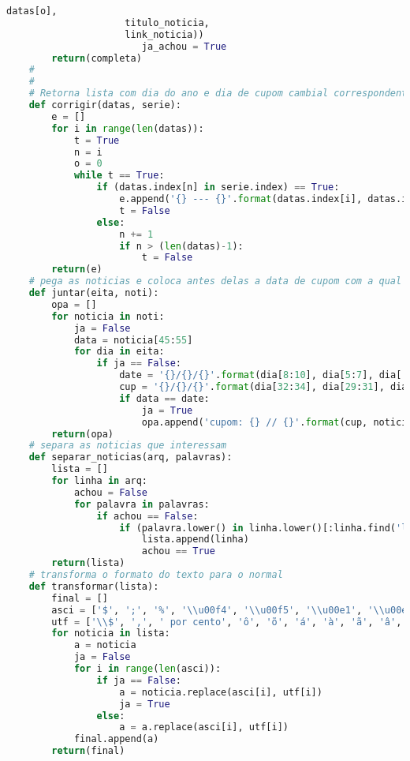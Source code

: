 \begin{lstlisting}[language=Python]
                     datas[o],
                     titulo_noticia,
                     link_noticia))
                        ja_achou = True
        return(completa)
    #
    #
    # Retorna lista com dia do ano e dia de cupom cambial correspondente
    def corrigir(datas, serie):
        e = []
        for i in range(len(datas)):
            t = True
            n = i
            o = 0
            while t == True:
                if (datas.index[n] in serie.index) == True:
                    e.append('{} --- {}'.format(datas.index[i], datas.index[n]))
                    t = False
                else:
                    n += 1
                    if n > (len(datas)-1):
                        t = False
        return(e)
    # pega as noticias e coloca antes delas a data de cupom com a qual ela é relacionada
    def juntar(eita, noti):
        opa = []
        for noticia in noti:
            ja = False
            data = noticia[45:55]
            for dia in eita:
                if ja == False:
                    date = '{}/{}/{}'.format(dia[8:10], dia[5:7], dia[:4])
                    cup = '{}/{}/{}'.format(dia[32:34], dia[29:31], dia[24:28])
                    if data == date:
                        ja = True
                        opa.append('cupom: {} // {}'.format(cup, noticia))
        return(opa)
    # separa as noticias que interessam
    def separar_noticias(arq, palavras):
        lista = []
        for linha in arq:
            achou = False
            for palavra in palavras:
                if achou == False:
                    if (palavra.lower() in linha.lower()[:linha.find('link')]) == True:
                        lista.append(linha)
                        achou == True
        return(lista)
    # transforma o formato do texto para o normal
    def transformar(lista):
        final = []
        asci = ['$', ';', '%', '\\u00f4', '\\u00f5', '\\u00e1', '\\u00e0', '\\u00e3', '\\u00e2', '\\u00e9', '\\u00ea', '\\u00ed', '\\u00f3', '\\u00fa', '\\u00e7']
        utf = ['\\$', ',', ' por cento', 'ô', 'õ', 'á', 'à', 'ã', 'â', 'é', 'ê', 'í', 'ó', 'ú', 'ç']
        for noticia in lista:
            a = noticia
            ja = False
            for i in range(len(asci)):
                if ja == False:
                    a = noticia.replace(asci[i], utf[i])
                    ja = True
                else:
                    a = a.replace(asci[i], utf[i])
            final.append(a)
        return(final)
        
\end{lstlisting}